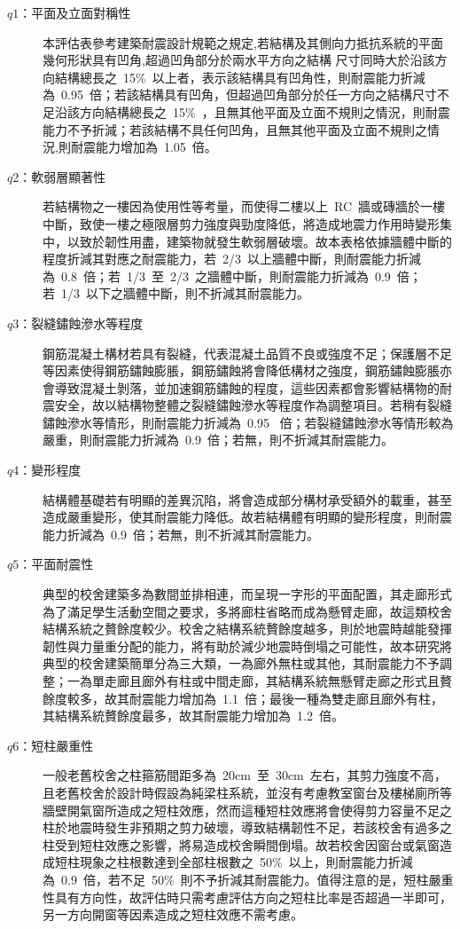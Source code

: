 \begin{description}
  \item[$q1$：平面及立面對稱性]
  本評估表參考建築耐震設計規範之規定,若結構及其側向力抵抗系統的平面幾何形狀具有凹角,超過凹角部分於兩水平方向之結構 尺寸同時大於沿該方向結構總長之~15\%~以上者，表示該結構具有凹角性，則耐震能力折減為~0.95~倍；若該結構具有凹角，但超過凹角部分於任一方向之結構尺寸不足沿該方向結構總長之~15\%~，且無其他平面及立面不規則之情況，則耐震能力不予折減；若該結構不具任何凹角，且無其他平面及立面不規則之情況,則耐震能力增加為~1.05~倍。
  \item[$q2$：軟弱層顯著性]
  若結構物之一樓因為使用性等考量，而使得二樓以上~RC~牆或磚牆於一樓中斷，致使一樓之極限層剪力強度與勁度降低，將造成地震力作用時變形集中，以致於韌性用盡，建築物就發生軟弱層破壞。故本表格依據牆體中斷的程度折減其對應之耐震能力，若~2/3~以上牆體中斷，則耐震能力折減為~0.8~倍；若~1/3~至~2/3~之牆體中斷，則耐震能力折減為~0.9~倍；若~1/3~以下之牆體中斷，則不折減其耐震能力。
  \item[$q3$：裂縫鏽蝕滲水等程度]
  鋼筋混凝土構材若具有裂縫，代表混凝土品質不良或強度不足；保護層不足等因素使得鋼筋鏽蝕膨脹，鋼筋鏽蝕將會降低構材之強度，鋼筋鏽蝕膨脹亦會導致混凝土剝落，並加速鋼筋鏽蝕的程度，這些因素都會影響結構物的耐震安全，故以結構物整體之裂縫鏽蝕滲水等程度作為調整項目。若稍有裂縫鏽蝕滲水等情形，則耐震能力折減為~0.95~ 倍；若裂縫鏽蝕滲水等情形較為嚴重，則耐震能力折減為~0.9~倍；若無，則不折減其耐震能力。
  \item[$q4$：變形程度]
  結構體基礎若有明顯的差異沉陷，將會造成部分構材承受額外的載重，甚至造成嚴重變形，使其耐震能力降低。故若結構體有明顯的變形程度，則耐震能力折減為~0.9~倍；若無，則不折減其耐震能力。
  \item[$q5$：平面耐震性]
  典型的校舍建築多為數間並排相連，而呈現一字形的平面配置，其走廊形式為了滿足學生活動空間之要求，多將廊柱省略而成為懸臂走廊，故這類校舍結構系統之贅餘度較少。校舍之結構系統贅餘度越多，則於地震時越能發揮韌性與力量重分配的能力，將有助於減少地震時倒塌之可能性，故本研究將典型的校舍建築簡單分為三大類，一為廊外無柱或其他，其耐震能力不予調整；一為單走廊且廊外有柱或中間走廊，其結構系統無懸臂走廊之形式且贅餘度較多，故其耐震能力增加為~1.1~倍；最後一種為雙走廊且廊外有柱，其結構系統贅餘度最多，故其耐震能力增加為~1.2~倍。
  \item[$q6$：短柱嚴重性]
  一般老舊校舍之柱箍筋間距多為~20cm~至~30cm~左右，其剪力強度不高，且老舊校舍於設計時假設為純梁柱系統，並沒有考慮教室窗台及樓梯廁所等牆壁開氣窗所造成之短柱效應，然而這種短柱效應將會使得剪力容量不足之柱於地震時發生非預期之剪力破壞，導致結構韌性不足，若該校舍有過多之柱受到短柱效應之影響，將易造成校舍瞬間倒塌。故若校舍因窗台或氣窗造成短柱現象之柱根數達到全部柱根數之~50\%~以上，則耐震能力折減為~0.9~倍，若不足~50\%~則不予折減其耐震能力。值得注意的是，短柱嚴重性具有方向性，故評估時只需考慮評估方向之短柱比率是否超過一半即可，另一方向開窗等因素造成之短柱效應不需考慮。
\end{description}


